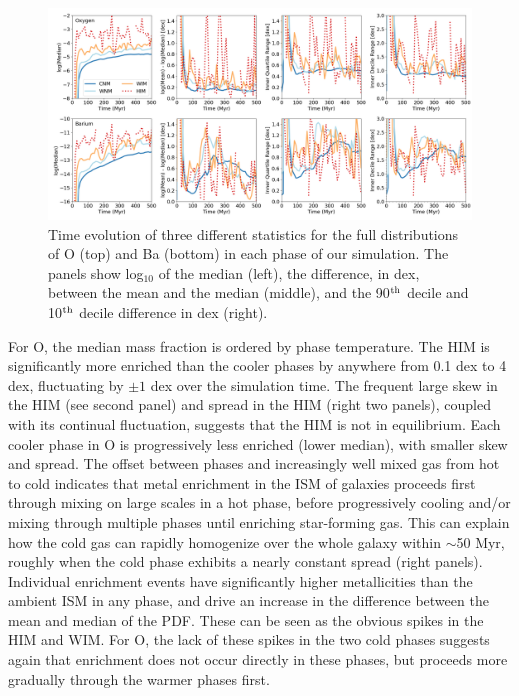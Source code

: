 \begin{figure}
\centering
\includegraphics[width=0.95\linewidth]{figures/ch3/O_Ba_distribution_evolution}
\caption{Time evolution of three different statistics for the full distributions of O (top) and Ba (bottom) in each phase of our simulation. The panels show log$_{10}$ of the median (left), the difference, in dex, between the mean and the median (middle), and the 90$^{\rm th}$ decile and 10$^{\rm th}$ decile difference in dex (right).}
\label{ch3:fig:phase-statistics}
\end{figure}

For O, the median mass fraction is ordered by phase temperature. The HIM is significantly more enriched than the cooler phases by anywhere from 0.1 dex to 4 dex, fluctuating by $\pm 1$ dex over the simulation time. The frequent large skew in the HIM (see second panel) and spread in the HIM (right two panels), coupled with its continual fluctuation, suggests that the HIM is not in equilibrium.
Each cooler phase in O is progressively less enriched (lower median), with smaller skew and spread. The offset between phases and increasingly well mixed gas from hot to cold indicates that metal enrichment in the ISM of galaxies proceeds first through mixing on large scales in a hot phase, before progressively cooling and/or mixing through multiple phases until enriching star-forming gas. This
    can explain
how the cold gas can rapidly homogenize over the whole galaxy within $\sim$50 Myr, roughly when the cold phase exhibits a nearly constant spread (right panels). Individual enrichment events
have significantly higher metallicities than the ambient ISM in any phase, and
drive an increase in the difference between the mean and median of the PDF. These can be seen as the obvious spikes in the HIM and WIM. For O, the lack of these spikes in the two cold phases suggests again that enrichment does not occur directly in these phases, but proceeds more gradually through the warmer phases first.

